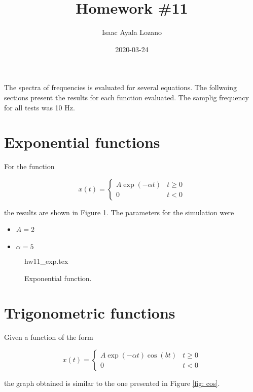 \documentclass[a4paper,12pt]{article}
\title{Homework \#11}
\author{Isaac Ayala Lozano}
\date{2020-03-24}
\begin{document}
\maketitle

The spectra of frequencies is evaluated for several equations.
The follwoing sections present the results for each function evaluated.
The samplig frequency for all tests was 10 Hz.

 \section{Exponential functions}

 For the function

\begin{equation*}
 x(t) = \begin{cases}
         A \exp (-\alpha t) & t \geq 0\\
         0 & t < 0
        \end{cases}
\end{equation*}

the results are shown in Figure \ref{fig: exp}.
The parameters for the simulation were

\begin{itemize}
 \item $A = $2
 \item $\alpha = 5$
\end{itemize}


\begin{figure}[htb!]
\centering
{hw11_exp.tex}
\caption{Exponential function.}
\label{fig: exp}
\end{figure}

\newpage
\pagebreak

\section{Trigonometric functions}

Given a function of the form

\begin{equation*}
 x(t) = \begin{cases}
         A \exp(-\alpha t) \cos (bt) & t \geq 0\\
         0 & t < 0
        \end{cases}
\end{equation*}

the graph obtained is similar to the one presented in Figure \ref{fig: cos}.
\end{document}
